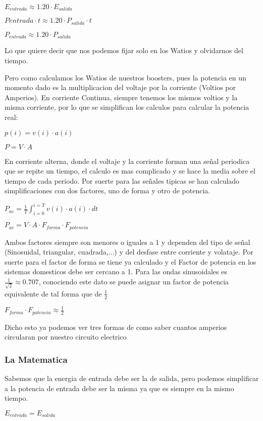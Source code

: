 $E_{entrada} \approx 1.20 \cdot E_{salida}$

$P{entrada}\cdot t \approx 1.20 \cdot P_{salida} \cdot t$

$P_{entrada} \approx 1.20 \cdot P_{salida}$

Lo que quiere decir que nos podemos fijar solo en los Watios y olvidarnos del tiempo.

Pero como calculamos los Watios de nuestros boosters, pues la potencia en un momento dado es la multiplicacion del voltaje por la corriente (Voltios por Amperios). En corriente Continua, siempre tenemos los mismos voltios y la misma corriente, por lo que se simplifican los calculos para calcular la potencia real:

$p(i) = v(i) \cdot a(i)$

$P = V \cdot A$

En corriente alterna, donde el voltaje y la corriente forman una señal periodica que se repite un tiempo, el calculo es mas complicado y se hace la media sobre el tiempo de cada periodo. Por suerte para las señales tipicas se han calculado simplificaciones con dos factores, uno de forma y otro de potencia.

$ P_{ac} =\frac{1}{T} \int_{i=0}^{i=T}{v(i)\cdot a(i)\cdot dt}$

$ P_{ac} = V \cdot A \cdot F_{forma} \cdot F_{potencia} $

Ambos factores siempre son menores o iguales a 1 y dependen del tipo de señal (Sinosuidal, triangular, cuadrada,...) y del desfase entre corriente y volataje. Por suerte para el factor de forma se tiene ya calculado y el Factor de potencia en los sistemas domesticos debe ser cercano a 1. Para las ondas sinusoidales es $\frac{1}{\sqrt{2}} \approx 0.707$, conociendo este dato se puede asignar un factor de potencia equivalente de tal forma que de $\frac{1}{2}$

$F_{forma} \cdot F_{potencia} \approx  \frac{1}{2} $

Dicho esto ya podemos ver tres formas de como saber cuantos amperios circularan por nuestro circuito electrico

\subsubsection{La Matematica}
Sabemos que la energia de entrada debe ser la de salida, pero podemos simplificar a la potencia de entrada debe ser la misma ya que es siempre en la mismo tiempo. 

$ E_{entrada} = E_{salida} $

